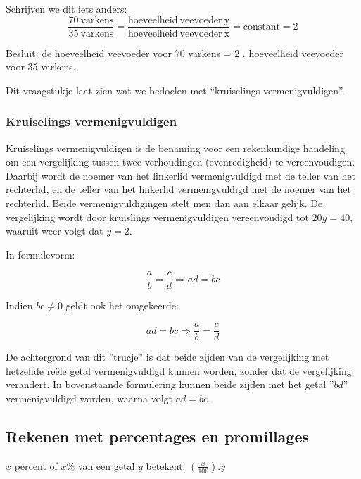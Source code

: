 Schrijven we dit iets anders: 
\begin{equation*}
\frac{70\:\mathrm{varkens}}{35\:\mathrm{varkens}}=\frac{\mathrm{hoeveelheid\:veevoeder\:y}}{\mathrm{hoeveelheid\:veevoeder\:x}}=\text{constant}=2
\end{equation*}

Besluit: de hoeveelheid veevoeder voor $70$ varkens = $2$ . hoeveelheid
veevoeder voor $35$ varkens.\medskip{}

Dit vraagstukje laat zien wat we bedoelen met ``kruiselings vermenigvuldigen''.

\subsubsection{Kruiselings vermenigvuldigen}

Kruiselings vermenigvuldigen is de benaming voor een rekenkundige handeling om een vergelijking tussen twee verhoudingen (evenredigheid) te vereenvoudigen. Daarbij wordt de noemer van het linkerlid vermenigvuldigd met de teller van het rechterlid, en de teller van het linkerlid vermenigvuldigd met de noemer van het rechterlid. Beide vermenigvuldigingen stelt men dan aan elkaar gelijk. De vergelijking  wordt door kruislings vermenigvuldigen vereenvoudigd tot $20y=40$, waaruit weer volgt dat $y=2$.

In formulevorm:

\begin{equation*}
\frac{a}{b} = \frac{c}{d} \Rightarrow ad = bc
\end{equation*}

Indien $bc \neq 0$ geldt ook het omgekeerde:

\begin{equation}
ad=bc \Rightarrow \frac{a}{b}=\frac{c}{d}
\end{equation}

De achtergrond van dit ''trucje'' is dat beide zijden van de vergelijking met hetzelfde re\"ele getal vermenigvuldigd kunnen worden, zonder dat de vergelijking verandert. In bovenstaande formulering kunnen beide zijden met het getal ''$bd$'' vermenigvuldigd worden, waarna volgt $ad=bc$.

\subsection{Rekenen met percentages en promillages}

$x$ percent of $x\%$ van een getal $y$ betekent: ${\displaystyle \left(\frac{x}{100}\right).y}$


